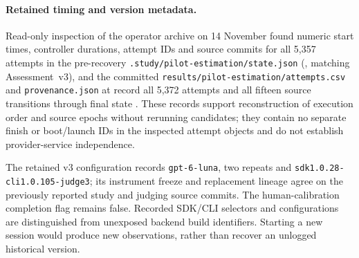 \paragraph{Retained timing and version metadata.}
Read-only inspection of the operator archive on 14 November found
numeric start times, controller durations, attempt IDs and source commits
for all 5,357 attempts in the pre-recovery
\nolinkurl{.study/pilot-estimation/state.json} (, matching
Assessment~v3), and the committed
\nolinkurl{results/pilot-estimation/attempts.csv} and
\nolinkurl{provenance.json} at  record all 5,372 attempts
and all fifteen source transitions through final state .
These records support reconstruction of execution order and source epochs
without rerunning candidates; they contain no separate finish or
boot/launch IDs in the inspected attempt objects and do not establish
provider-service independence.

The retained v3 configuration records \nolinkurl{gpt-6-luna}, two repeats
and \nolinkurl{sdk1.0.28-cli1.0.105-judge3}; its instrument freeze and
replacement lineage agree on the previously reported study and judging
source commits. The human-calibration completion flag remains false.
Recorded SDK/CLI selectors and configurations are distinguished from
unexposed backend build identifiers. Starting a new session would produce
new observations, rather than recover an unlogged historical version.

